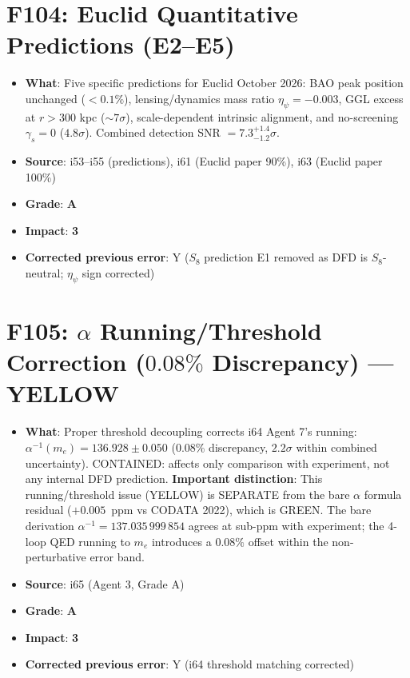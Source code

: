 \documentclass[11pt,a4paper]{article}
\newcommand{\grade}[1]{\textbf{#1}}
\newcommand{\impact}[1]{\textbf{#1}}
\begin{document}
\section{F104: Euclid Quantitative Predictions (E2--E5)}
\begin{itemize}[nosep]
\item \textbf{What}: Five specific predictions for Euclid October 2026: BAO peak position unchanged ($< 0.1\%$), lensing/dynamics mass ratio $\eta_\psi = -0.003$, GGL excess at $r > 300$ kpc ($\sim 7\sigma$), scale-dependent intrinsic alignment, and no-screening $\gamma_s = 0$ ($4.8\sigma$). Combined detection SNR $= 7.3^{+1.4}_{-1.2}\sigma$.
\item \textbf{Source}: i53--i55 (predictions), i61 (Euclid paper 90\%), i63 (Euclid paper 100\%)
\item \textbf{Grade}: \grade{A}
\item \textbf{Impact}: \impact{3}
\item \textbf{Corrected previous error}: Y ($S_8$ prediction E1 removed as DFD is $S_8$-neutral; $\eta_\psi$ sign corrected)
\end{itemize}

\section{F105: $\alpha$ Running/Threshold Correction ($0.08\%$ Discrepancy) --- YELLOW}
\begin{itemize}[nosep]
\item \textbf{What}: Proper threshold decoupling corrects i64 Agent 7's running: $\alpha^{-1}(m_e) = 136.928 \pm 0.050$ (0.08\% discrepancy, $2.2\sigma$ within combined uncertainty). CONTAINED: affects only comparison with experiment, not any internal DFD prediction. \textbf{Important distinction}: This running/threshold issue (YELLOW) is SEPARATE from the bare $\alpha$ formula residual ($+0.005$~ppm vs CODATA 2022), which is GREEN. The bare derivation $\alpha^{-1} = 137.035\,999\,854$ agrees at sub-ppm with experiment; the 4-loop QED running to $m_e$ introduces a $0.08\%$ offset within the non-perturbative error band.
\item \textbf{Source}: i65 (Agent 3, Grade A)
\item \textbf{Grade}: \grade{A}
\item \textbf{Impact}: \impact{3}
\item \textbf{Corrected previous error}: Y (i64 threshold matching corrected)
\end{itemize}
\end{document}
